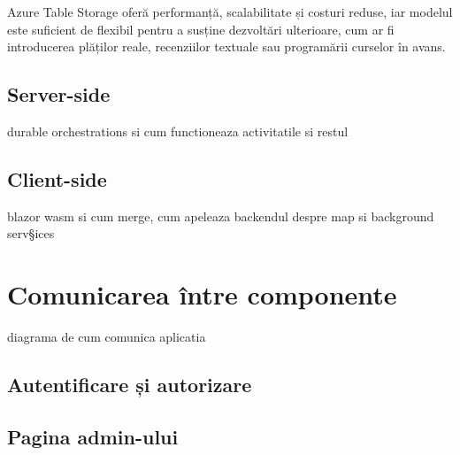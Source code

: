 Azure Table Storage oferă performanță, scalabilitate și costuri reduse, iar modelul este suficient
de flexibil pentru a susține dezvoltări ulterioare, cum ar fi introducerea plăților reale, recenziilor textuale 
sau programării curselor în avans.

\subsection{Server-side}


durable orchestrations si cum functioneaza activitatile si restul
\subsection{Client-side}
blazor wasm si cum merge, cum apeleaza backendul
despre map si background serv§ices
\section{Comunicarea între componente}
diagrama de cum comunica aplicatia
\subsection{Autentificare și autorizare}
\subsection{Pagina admin-ului}